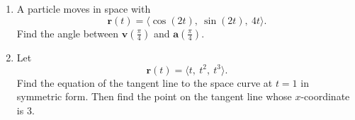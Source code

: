 \documentclass[12pt]{article}
\begin{document}
\begin{enumerate}[leftmargin=*, itemsep=1em, topsep=0.8em]
  \item A particle moves in space with
  \[
  \mathbf{r}(t)=\langle \cos(2t),\ \sin(2t),\ 4t\rangle.
  \]
  Find the angle between $\mathbf{v}\!\left(\frac{\pi}{4}\right)$ and $\mathbf{a}\!\left(\frac{\pi}{4}\right)$.

  \item Let
  \[
  \mathbf{r}(t)=\langle t,\ t^2,\ t^3\rangle.
  \]
  Find the equation of the tangent line to the space curve at $t=1$ in symmetric form. Then find the point on the tangent line whose $x$-coordinate is $3$.
\end{enumerate}
\end{document}
